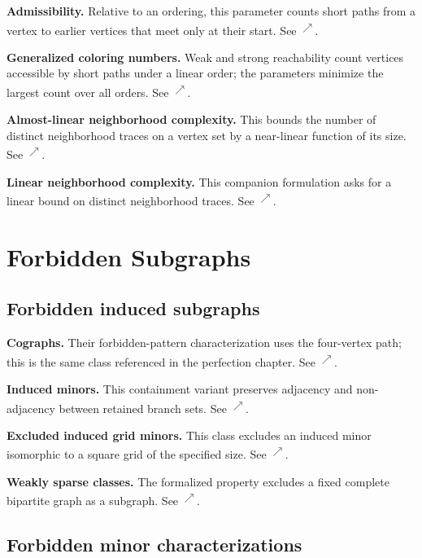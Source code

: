 \documentclass[11pt]{article}
\newcommand{\source}[2]{\textsuperscript{\href{https://laxarchive.org/#1/#2.html}{$\nearrow$}}}
\newcommand{\surveychapter}[2]{\setcounter{section}{#1}\section{#2}}
\begin{document}
\textbf{Admissibility.}
Relative to an ordering, this parameter counts short
paths from a vertex to earlier vertices that meet only at their start. See
\source{lax-199508}{Lax199508.Admissibility}.

\textbf{Generalized coloring numbers.}
Weak and strong reachability count
vertices accessible by short paths under a linear order; the parameters
minimize the largest count over all orders. See
\source{lax-199508}{Lax199508.ColoringNumbers}.

\textbf{Almost-linear neighborhood complexity.}
This bounds the number of
distinct neighborhood traces on a vertex set by a near-linear function of
its size. See \source{lax-199508}{Lax199508.NeighborhoodComplexity}.

\textbf{Linear neighborhood complexity.}
This companion formulation asks for
a linear bound on distinct neighborhood traces. See
\source{lax-9}{Lax9.NeighborhoodComplexity}.
\surveychapter{6}{Forbidden Subgraphs}

\subsection{Forbidden induced subgraphs}

\textbf{Cographs.}
Their forbidden-pattern characterization uses the
four-vertex path; this is the same class referenced in the perfection
chapter. See \source{lax-214022}{Lax214022.Cographs}.

\textbf{Induced minors.}
This containment variant preserves adjacency and
non-adjacency between retained branch sets. See
\source{lax-762056}{Lax762056.InducedMinors}.

\textbf{Excluded induced grid minors.}
This class excludes an induced minor
isomorphic to a square grid of the specified size. See
\source{lax-762056}{Lax762056.Grid}.

\textbf{Weakly sparse classes.}
The formalized property excludes a fixed
complete bipartite graph as a subgraph. See
\source{lax-710763}{Lax710763.GraphClasses}.
\subsection{Forbidden minor characterizations}
\end{document}
